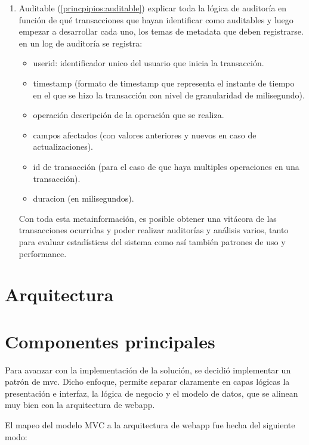 \begin{enumerate}
    \item Auditable (\ref{princpipios:auditable})
    explicar toda la lógica de auditoría en función de qué transacciones que hayan identificar como auditables y luego empezar a desarrollar cada uno, los temas de metadata que deben registrarse. en un log de auditoría se registra:

    \begin{itemize}
        \item userid: identificador unico del usuario que inicia la transacción.
        \item timestamp (formato de timestamp que representa el instante de tiempo en el que se hizo la transacción con nivel de granularidad de milisegundo).
        \item operación descripción de la operación que se realiza.
        \item campos afectados (con valores anteriores y nuevos en caso de actualizaciones).
        \item id de transacción (para el caso de que haya multiples operaciones en una transacción).
        \item duracion (en milisegundos).
        
    \end{itemize}

    Con toda esta metainformación, es posible obtener una vitácora de las transacciones ocurridas y poder realizar auditorías y análisis varios, tanto para evaluar estadísticas del sistema como así también patrones de uso y performance.
    
\end{enumerate}


\section{Arquitectura}
\section{Componentes principales}

Para avanzar con la implementación de la solución, se decidió implementar un patrón de \gls{mvc}. Dicho enfoque, permite separar claramente en capas lógicas la presentación e interfaz, la lógica de negocio y el modelo de datos, que se alinean muy bien con la arquitectura de webapp.

El mapeo del modelo MVC a la arquitectura de webapp fue hecha del siguiente modo:

